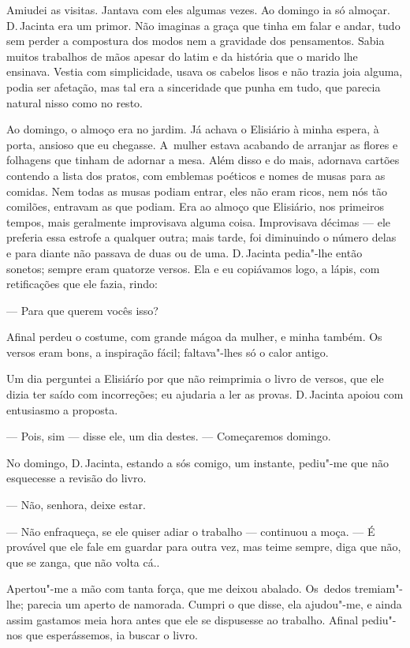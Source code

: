 \begin{linenumbers}
Amiudei as visitas. Jantava com eles algumas vezes. Ao domingo ia só
almoçar. D.\,Jacinta era um primor. Não imaginas a graça que tinha em
falar e andar, tudo sem perder a compostura dos modos nem a gravidade
dos pensamentos. Sabia muitos trabalhos de mãos apesar do latim e da
história que o marido lhe ensinava. Vestia com simplicidade, usava os
cabelos lisos e não trazia joia alguma, podia ser afetação, mas tal era
a sinceridade que punha em tudo, que parecia natural nisso como no
resto.

Ao domingo, o almoço era no jardim. Já achava o Elisiário à minha
espera, à porta, ansioso que eu chegasse. A~mulher estava acabando de
arranjar as flores e folhagens que tinham de adornar a mesa. Além disso
e do mais, adornava cartões contendo a lista dos pratos, com emblemas
poéticos e nomes de musas para as comidas. Nem todas as musas podiam
entrar, eles não eram ricos, nem nós tão comilões, entravam as que
podiam. Era ao almoço que Elisiário, nos primeiros tempos, mais
geralmente improvisava alguma coisa. Improvisava décimas --- ele preferia
essa estrofe a qualquer outra; mais tarde, foi diminuindo o número delas
e para diante não passava de duas ou de uma. D.\,Jacinta pedia"-lhe então
sonetos; sempre eram quatorze versos. Ela e eu copiávamos logo, a lápis,
com retificações que ele fazia, rindo:

--- Para que querem vocês isso?

Afinal perdeu o costume, com grande mágoa da mulher, e minha também. Os
versos eram bons, a inspiração fácil; faltava"-lhes só o calor antigo.

Um dia perguntei a Elisiárío por que não reimprimia o livro de versos,
que ele dizia ter saído com incorreções; eu ajudaria a ler as provas. D.\,Jacinta apoiou com entusiasmo a proposta.

--- Pois, sim --- disse ele, um dia destes. --- Começaremos domingo.

No domingo, D.\,Jacinta, estando a sós comigo, um instante, pediu"-me que
não esquecesse a revisão do livro.

--- Não, senhora, deixe estar.

--- Não enfraqueça, se ele quiser adiar o trabalho --- continuou a moça.
--- É provável que ele fale em guardar para outra vez, mas teime sempre,
diga que não, que se zanga, que não volta cá..

Apertou"-me a mão com tanta força, que me deixou abalado. Os~dedos
tremiam"-lhe; parecia um aperto de namorada. Cumpri o que disse, ela
ajudou"-me, e ainda assim gastamos meia hora antes que ele se dispusesse
ao trabalho. Afinal pediu"-nos que esperássemos, ia buscar o livro.


\end{linenumbers}
